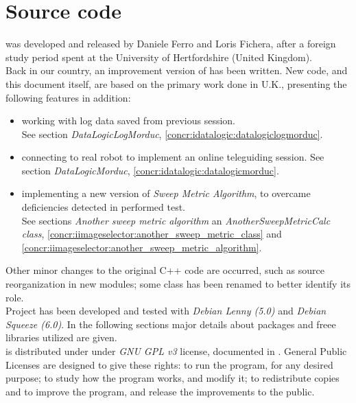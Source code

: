 \setcounter{figure}{0}
\setcounter{table}{0}
\setcounter{lstlisting}{0}

\chapter{Source code}
\label{sourcecode}
\minitoc

\framework{} was developed and released
by Daniele Ferro and Loris Fichera, after a foreign study
period spent at the University of Hertfordshire (United Kingdom).
\\
Back in our country, an improvement version of \framework{} has
been written.
New code, and this document itself, are based on the primary
work done in U.K., presenting the following features in
addition:

\begin{itemize}

\item working with log data saved from previous
      \morduc{} session. \\
      See section \textit{DataLogicLogMorduc},
      \ref{concr:idatalogic:datalogiclogmorduc}.
      

\item connecting to real \morduc{} robot to implement
      an online teleguiding session.
      See section \textit{DataLogicMorduc},
      \ref{concr:idatalogic:datalogicmorduc}.

\item implementing a new version of \textit{Sweep Metric
      Algorithm}, to overcame deficiencies detected in
      performed test. \\
      See sections \textit{Another sweep metric algorithm}
      an \textit{AnotherSweepMetricCalc class},
      \ref{concr:iimageselector:another_sweep_metric_class}
      and
      \ref{concr:iimageselector:another_sweep_metric_algorithm}.

\end{itemize}

Other minor changes to the original C++ code are occurred, such
as source reorganization in new modules; some class has
been renamed to better identify its role.
\\
Project has been developed and tested with \textit{Debian Lenny (5.0)}
and \textit{Debian Squeeze (6.0)}. In the following sections major
details about packages and freee libraries utilized are given.
\\
\framework{} is distributed under under \textit{GNU GPL v3} license, 
documented in \cite{license:gplv3}. 
General Public Licenses are designed to give these rights: to run the
program, for any desired purpose; to study how the program works, and
modify it; to redistribute copies and to improve the program, and
release the improvements to the public.

\clearpage

